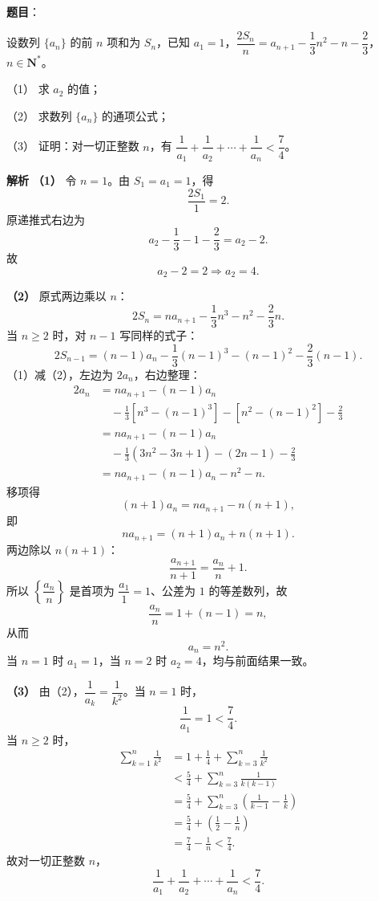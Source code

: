 \begin{answer}

\textbf{题目}：

设数列 $\{a_n\}$ 的前 $n$ 项和为 $S_n$，已知 $a_1=1$，$\dfrac{2S_n}{n}=a_{n+1}-\dfrac13n^2-n-\dfrac23$，$n\in\mathbf N^*$。

（1） 求 $a_2$ 的值；

（2） 求数列 $\{a_n\}$ 的通项公式；

（3） 证明：对一切正整数 $n$，有 $\dfrac1{a_1}+\dfrac1{a_2}+\cdots+\dfrac1{a_n}<\dfrac74$。

\textbf{解析}
\textbf{（1）}
令 $n=1$。由 $S_1=a_1=1$，得
\nopagebreak[4]
\[\frac{2S_1}{1}=2.\]
原递推式右边为
\nopagebreak[4]
\[a_2-\frac13-1-\frac23=a_2-2.\]
故
\nopagebreak[4]
\[a_2-2=2\Longrightarrow a_2=4.\]

\textbf{（2）}
原式两边乘以 $n$：
\nopagebreak[4]
\[2S_n=na_{n+1}-\frac13n^3-n^2-\frac23n. \tag{1}\]
当 $n\geqslant2$ 时，对 $n-1$ 写同样的式子：
\nopagebreak[4]
\[2S_{n-1}=(n-1)a_n-\frac13(n-1)^3-(n-1)^2-\frac23(n-1). \tag{2}\]
（1）减（2），左边为 $2a_n$，右边整理：
\nopagebreak[4]
\[\begin{aligned}
2a_n
&=na_{n+1}-(n-1)a_n\\
&\quad-\frac13\left[n^3-(n-1)^3\right]
-\left[n^2-(n-1)^2\right]-\frac23\\
&=na_{n+1}-(n-1)a_n\\
&\quad-\frac13(3n^2-3n+1)-(2n-1)-\frac23\\
&=na_{n+1}-(n-1)a_n-n^2-n.
\end{aligned}\]
移项得
\nopagebreak[4]
\[(n+1)a_n=na_{n+1}-n(n+1),\]
即
\nopagebreak[4]
\[na_{n+1}=(n+1)a_n+n(n+1).\]
两边除以 $n(n+1)$：
\nopagebreak[4]
\[\frac{a_{n+1}}{n+1}=\frac{a_n}{n}+1.\]
所以 $\left\{\dfrac{a_n}{n}\right\}$ 是首项为 $\dfrac{a_1}{1}=1$、公差为 $1$ 的等差数列，故
\nopagebreak[4]
\[\frac{a_n}{n}=1+(n-1)=n,\]
从而
\nopagebreak[4]
\[a_n=n^2.\]
当 $n=1$ 时 $a_1=1$，当 $n=2$ 时 $a_2=4$，均与前面结果一致。

\textbf{（3）}
由（2），$\dfrac1{a_k}=\dfrac1{k^2}$。当 $n=1$ 时，
\nopagebreak[4]
\[\frac1{a_1}=1<\frac74.\]
当 $n\geqslant2$ 时，
\nopagebreak[4]
\[\begin{aligned}
\sum_{k=1}^n\frac1{k^2}
&=1+\frac14+\sum_{k=3}^n\frac1{k^2}\\
&<\frac54+\sum_{k=3}^n\frac1{k(k-1)}\\
&=\frac54+\sum_{k=3}^n\left(\frac1{k-1}-\frac1k\right)\\
&=\frac54+\left(\frac12-\frac1n\right)\\
&=\frac74-\frac1n<\frac74.
\end{aligned}\]
故对一切正整数 $n$，
\nopagebreak[4]
\[\frac1{a_1}+\frac1{a_2}+\cdots+\frac1{a_n}<\frac74.\]


\end{answer}
